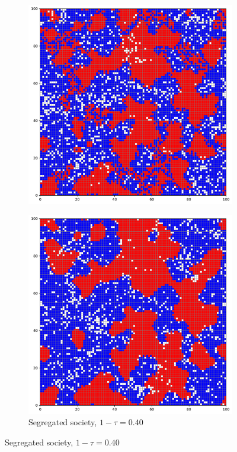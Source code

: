 \documentclass[../main.tex]{subfiles}
\begin{document}
\begin{figure}[H]
\begin{subfigure}{0.45\textwidth}
	\includegraphics[width=\textwidth]{figs/schelling_model_0.33.pdf}	
	\end{subfigure}	
	\begin{subfigure}{0.45\textwidth}	
	\centering
     \caption{Segregated society, $1-\tau = 0.40$}
	\includegraphics[width=\textwidth]{figs/schelling_model_0.4.pdf}	

\end{subfigure}
\end{figure}
\end{document}
